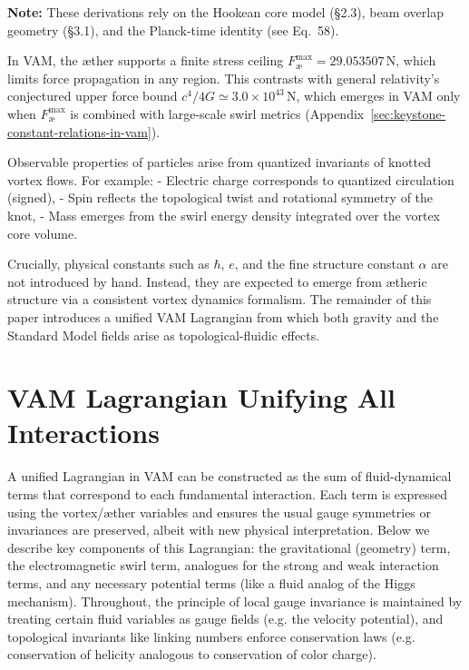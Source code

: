 \documentclass[a4paper,12pt]{article}
\begin{document}
\vspace{0.5em}
\begin{center}
    \footnotesize
    \textbf{Note:} These derivations rely on the Hookean core model (§2.3), beam overlap geometry (§3.1), and the Planck-time identity (see Eq.~58).
\end{center}

In VAM, the æther supports a finite stress ceiling \( F^{\max}_\text{\ae} = 29.053507\,\mathrm{N}\), which limits force propagation in any region. This contrasts with general relativity’s conjectured upper force bound \(c^4 / 4G \simeq 3.0 \times 10^{43}\,\mathrm{N}\), which emerges in VAM only when \( F^{\max}_\text{\ae}\) is combined with large-scale swirl metrics (Appendix~\ref{sec:keystone-constant-relations-in-vam}).

Observable properties of particles arise from quantized invariants of knotted vortex flows. For example:
- Electric charge corresponds to quantized circulation (signed),
- Spin reflects the topological twist and rotational symmetry of the knot,
- Mass emerges from the swirl energy density integrated over the vortex core volume.

Crucially, physical constants such as \(\hbar\), \(e\), and the fine structure constant \(\alpha\) are not introduced by hand. Instead, they are expected to emerge from ætheric structure via a consistent vortex dynamics formalism. The remainder of this paper introduces a unified VAM Lagrangian from which both gravity and the Standard Model fields arise as topological-fluidic effects.

\section{VAM Lagrangian Unifying All Interactions}

A unified Lagrangian in VAM can be constructed as the sum of fluid-dynamical terms that correspond to each fundamental interaction. Each term is expressed using the vortex/æther variables and ensures the usual gauge symmetries or invariances are preserved, albeit with new physical interpretation. Below we describe key components of this Lagrangian: the gravitational (geometry) term, the electromagnetic swirl term, analogues for the strong and weak interaction terms, and any necessary potential terms (like a fluid analog of the Higgs mechanism). Throughout, the principle of local gauge invariance is maintained by treating certain fluid variables as gauge fields (e.g. the velocity potential), and topological invariants like linking numbers enforce conservation laws (e.g. conservation of helicity analogous to conservation of color charge).
\end{document}
